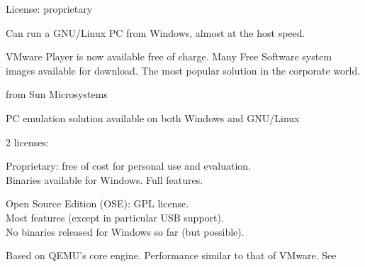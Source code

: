    \startitemize
    \item License: proprietary
    \item Can run a GNU/Linux PC from Windows, almost at the host speed.
    \item VMware Player is now available free of charge.  Many Free
      Software system images available for download.
    \stopitemize
    The most popular solution in the corporate world.

     from Sun Microsystems
    \startitemize
    \item PC emulation solution available on both Windows and GNU/Linux
    \item 2 licenses:
      \startitemize
      \item Proprietary: free of cost for personal use and evaluation.\\
        Binaries available for Windows. Full features.
      \item Open Source Edition (OSE): GPL license.\\
        Most features (except in particular USB support).\\
        No binaries released for Windows so far (but possible).
      \stopitemize
    \item Based on QEMU's core engine. Performance similar to that of
      VMware.
    \stopitemize
    See 

